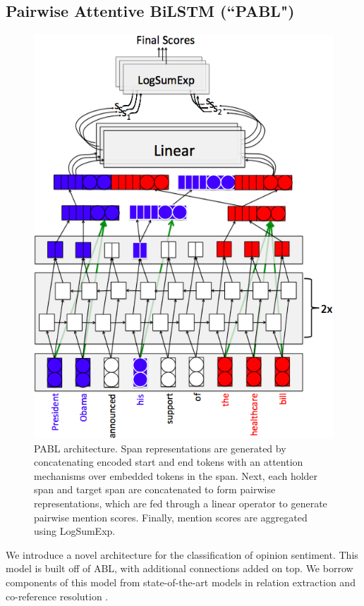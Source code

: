 \documentclass[11pt,a4paper]{article}
\begin{document}
\subsection{Pairwise Attentive BiLSTM (``PABL")}
\begin{figure} \label{fig:model2}
\centering
\includegraphics[scale=0.4]{adv.png}
\caption{PABL architecture. Span representations are generated by concatenating encoded start and end tokens with an attention mechanisms over embedded tokens in the span. Next, each holder span and target span are concatenated to form pairwise representations, which are fed through a linear operator to generate pairwise mention scores. Finally, mention scores are aggregated using LogSumExp.}
\end{figure}

We introduce a novel architecture for the classification of opinion sentiment.
This model is built off of ABL, with additional connections added on top.
We borrow components of this model from state-of-the-art models in relation extraction \citep{Verga:18} and co-reference resolution \citep{Lee:17}.
\end{document}
